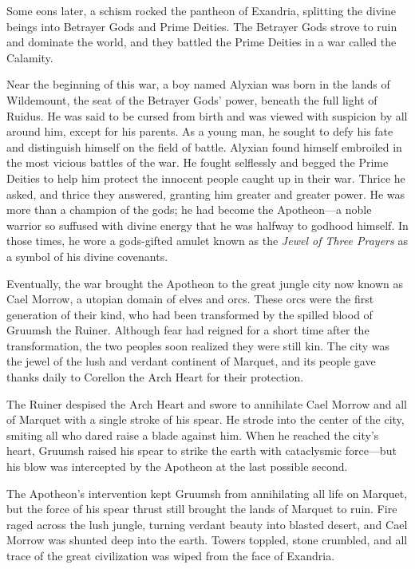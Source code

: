 \documentclass[letterpaper, 11pt, bg=full, twocolumn]{dndbook}
\begin{document}
Some eons later, a schism rocked the pantheon of Exandria, splitting the divine beings into Betrayer Gods and Prime Deities. The Betrayer Gods strove to ruin and dominate the world, and they battled the Prime Deities in a war called the Calamity.

Near the beginning of this war, a boy named Alyxian was born in the lands of Wildemount, the seat of the Betrayer Gods' power, beneath the full light of Ruidus. He was said to be cursed from birth and was viewed with suspicion by all around him, except for his parents. As a young man, he sought to defy his fate and distinguish himself on the field of battle. Alyxian found himself embroiled in the most vicious battles of the war. He fought selflessly and begged the Prime Deities to help him protect the innocent people caught up in their war. Thrice he asked, and thrice they answered, granting him greater and greater power. He was more than a champion of the gods; he had become the Apotheon---a noble warrior so suffused with divine energy that he was halfway to godhood himself. In those times, he wore a gods-gifted amulet known as the \textit{Jewel of Three Prayers} as a symbol of his divine covenants.

Eventually, the war brought the Apotheon to the great jungle city now known as Cael Morrow, a utopian domain of elves and orcs. These orcs were the first generation of their kind, who had been transformed by the spilled blood of Gruumsh the Ruiner. Although fear had reigned for a short time after the transformation, the two peoples soon realized they were still kin. The city was the jewel of the lush and verdant continent of Marquet, and its people gave thanks daily to Corellon the Arch Heart for their protection.

The Ruiner despised the Arch Heart and swore to annihilate Cael Morrow and all of Marquet with a single stroke of his spear. He strode into the center of the city, smiting all who dared raise a blade against him. When he reached the city's heart, Gruumsh raised his spear to strike the earth with cataclysmic force---but his blow was intercepted by the Apotheon at the last possible second.

The Apotheon's intervention kept Gruumsh from annihilating all life on Marquet, but the force of his spear thrust still brought the lands of Marquet to ruin. Fire raged across the lush jungle, turning verdant beauty into blasted desert, and Cael Morrow was shunted deep into the earth. Towers toppled, stone crumbled, and all trace of the great civilization was wiped from the face of Exandria.
\end{document}

